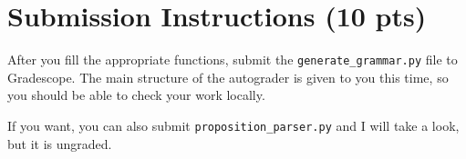 \documentclass{article}
\begin{document}

    
\section*{Submission Instructions (10 pts)}
    After you fill the appropriate functions, submit the \lstinline{generate_grammar.py} file to Gradescope. The main structure of the autograder is given to you this time, so you should be able to check your work locally.

    \vspace{2mm}
    If you want, you can also submit \lstinline{proposition_parser.py} and I will take a look, but it is ungraded.

\end{document}
